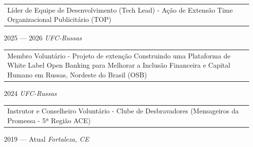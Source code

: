 \begin{tabular}{p{41em}}
    Líder de Equipe de Desenvolvimento (Tech Lead) - Ação de Extensão Time
    Organizacional Publicitário (TOP)
\end{tabular}
\hfill 2025 --- 2026
\textit{UFC-Russas}

\begin{tabular}{p{41em}}
    Membro Voluntário - Projeto de extenção Construindo uma Plataforma de White Label
    Open Banking para Melhorar a Inclusão Financeira e Capital Humano em Russas,
    Nordeste do Brasil (OSB)
\end{tabular}
\hfill 2024
\textit{UFC-Russas}

\begin{tabular}{p{41em}}
    Instrutor e Conselheiro Voluntário - Clube de Desbravadores (Mensageiros da Promessa - 5ª Região ACE)
\end{tabular}
\hfill 2019 --- Atual
\textit{Fortaleza, CE}